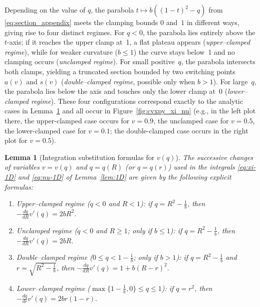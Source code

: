 \documentclass{article}
\newtheorem{lemma}[theorem]{Lemma}
\newcommand{\1}{\mathds{1}}
\begin{document}
Depending on the value of \(q\), the parabola \(t \mapsto b((1-t)^2 - q)\) from \eqref{eq:section_appendix} meets the clamping bounds \(0\) and~\(1\) in different ways, giving rise to four distinct regimes.
For \(q<0\), the parabola lies entirely above the \(t\)-axis; if it reaches the upper clamp at~1, a flat plateau appears (\emph{upper–clamped regime}), while for weaker curvature (\(b\le1\)) the curve stays below~1 and no clamping occurs (\emph{unclamped regime}).
For small positive~\(q\), the parabola intersects both clamps, yielding a truncated section bounded by two switching points \(a(v)\) and \(s(v)\) (\emph{double–clamped regime}, possible only when \(b>1\)).
For large~\(q\), the parabola lies below the axis and touches only the lower clamp at~0 (\emph{lower–clamped regime}).
These four configurations correspond exactly to the analytic cases in Lemma~\ref{lem:vq} and all occur in Figure~\ref{fig:cvxpy_xi_nu} (e.g., in the left plot there, the upper-clamped case occurs for $v=0.9$, the unclamped case for $v=0.5$, the lower-clamped case for $v=0.1$; the double-clamped case occurs in the right plot for $v=0.5$).

\begin{lemma}[Integration substitution formulas for $v(q)$]\label{lem:vq}
The successive changes of variables $v=v(q)$ and $q=q(R)$ (or $q=q(r)$)
used in the integrals \eqref{eq:xi-1D} and \eqref{eq:nu-1D} of Lemma~\ref{lem:1D} are given by the following
explicit formulas:
\begin{enumerate}[label=(\roman*)]
\item Upper--clamped regime (\(q<0\) and \(R<1\)): if \(q=R^2-\tfrac{1}{b}\), then
\(-\frac{dq}{dR}v'(q)=2bR^2.\)

\item Unclamped regime (\(q<0\) and \(R\ge1\); only if \(b\le1\)): if \(q=R^2-\tfrac{1}{b}\), then
\(-\frac{dq}{dR}v'(q)=2bR.\)

\item Double--clamped regime (\(0\le q<1-\tfrac{1}{b}\); only if \(b>1\)): if \(q=R^2-\tfrac{1}{b}\) and \(r=\sqrt{R^2-\tfrac{1}{b}}\), then
\(-\frac{dq}{dR}v'(q)=1+b(R-r)^2.\)

\item Lower--clamped regime (\(\max\{1-\tfrac{1}{b},0\}\le q\le 1\)): if \(q=r^2\), then
\(-\frac{dq}{dr}v'(q)=2br(1-r).\)
\end{enumerate}
\end{lemma}
\end{document}
